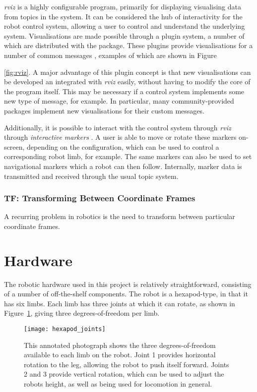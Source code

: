 \emph{rviz} is a highly configurable program, primarily for displaying visualising data from topics in the system. It can be considered the hub of interactivity for the robot control system, allowing a user to control and understand the underlying system. Visualisations are made possible through a plugin system, a number of which are distributed with the package. These plugins provide visualisations for a number of common messages \cite{ros_wiki_rviz_datatypes}, examples of which are shown in Figure~{\ref{fig:rviz}. A major advantage of this plugin concept is that new visualisations can be developed an integrated with \emph{rviz} easily, without having to modify the core of the program itself. This may be necessary if a control system implements some new type of message, for example. In particular, many community-provided packages implement new visualisations for their custom messages.

Additionally, it is possible to interact with the control system through \emph{rviz} through \emph{interactive markers} \cite{ros_wiki_rviz_intmark}. A user is able to move or rotate these markers on-screen, depending on the configuration, which can be used to control a corresponding robot limb, for example. The same markers can also be used to set navigational markers which a robot can then follow. Internally, marker data is transmitted and received through the usual topic system.

\subsubsection{TF: Transforming Between Coordinate Frames}
A recurring problem in robotics is the need to transform between particular coordinate frames. 


\section{Hardware}

The robotic hardware used in this project is relatively straightforward, consisting of a number of off-the-shelf components. The robot is a hexapod-type, in that it has six limbs. Each limb has three joints at which it can rotate, as shown in Figure~\ref{fig:hexapod_dof}, giving three degrees-of-freedom per limb. 

\begin{figure}[h]
    \centering
    \texttt{[image: hexapod\_joints]}
    \caption{This annotated photograph shows the three degrees-of-freedom available to each limb on the robot. Joint 1 provides horizontal rotation to the leg, allowing the robot to push itself forward. Joints 2 and 3 provide vertical rotation, which can be used to adjust the robots height, as well as being used for locomotion in general.}
    \label{fig:hexapod_dof}
\end{figure}

}
